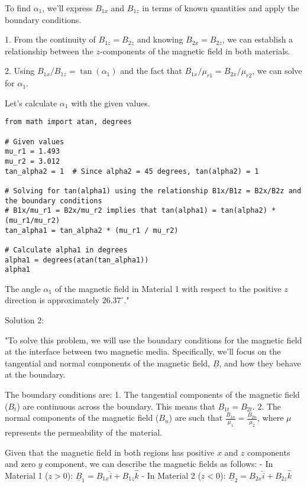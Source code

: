 To find \( \alpha_{1} \), we'll express \( B_{1x} \) and \( B_{1z} \) in terms of known quantities and apply the boundary conditions.

1. From the continuity of \( B_{1z} = B_{2z} \) and knowing \( B_{2x} = B_{2z} \), we can establish a relationship between the \( z \)-components of the magnetic field in both materials.

2. Using \( B_{1x}/B_{1z} = \tan(\alpha_{1}) \) and the fact that \( B_{1x}/\mu_{r1} = B_{2x}/\mu_{r2} \), we can solve for \( \alpha_{1} \).

Let's calculate \( \alpha_{1} \) with the given values.

\begin{verbatim}
from math import atan, degrees

# Given values
mu_r1 = 1.493
mu_r2 = 3.012
tan_alpha2 = 1  # Since alpha2 = 45 degrees, tan(alpha2) = 1

# Solving for tan(alpha1) using the relationship B1x/B1z = B2x/B2z and the boundary conditions
# B1x/mu_r1 = B2x/mu_r2 implies that tan(alpha1) = tan(alpha2) * (mu_r1/mu_r2)
tan_alpha1 = tan_alpha2 * (mu_r1 / mu_r2)

# Calculate alpha1 in degrees
alpha1 = degrees(atan(tan_alpha1))
alpha1
\end{verbatim}

The angle \( \alpha_{1} \) of the magnetic field in Material 1 with respect to the positive \( z \) direction is approximately \( 26.37^\circ \)."

Solution 2:

"To solve this problem, we will use the boundary conditions for the magnetic field at the interface between two magnetic media. Specifically, we'll focus on the tangential and normal components of the magnetic field, \( \underline{B} \), and how they behave at the boundary.

The boundary conditions are:
1. The tangential components of the magnetic field (\(B_{t}\)) are continuous across the boundary. This means that \(B_{1t} = B_{2t}\).
2. The normal components of the magnetic field (\(B_{n}\)) are such that \(\frac{B_{1n}}{\mu_{1}} = \frac{B_{2n}}{\mu_{2}}\), where \( \mu \) represents the permeability of the material.

Given that the magnetic field in both regions has positive \(x\) and \(z\) components and zero \(y\) component, we can describe the magnetic fields as follows:
- In Material 1 (\(z > 0\)): \( \underline{B}_{1} = B_{1x} \hat{i} + B_{1z} \hat{k} \)
- In Material 2 (\(z < 0\)): \( \underline{B}_{2} = B_{2x} \hat{i} + B_{2z} \hat{k} \)

